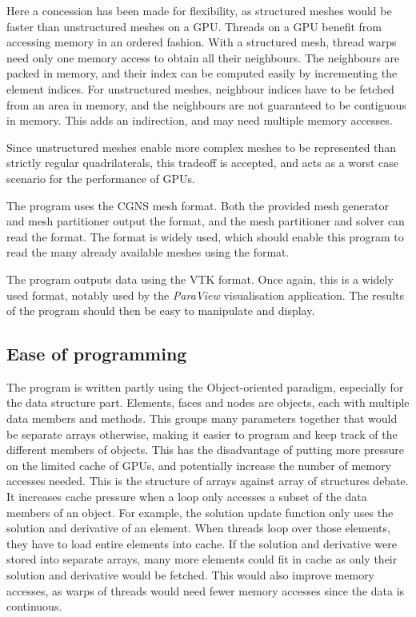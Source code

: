 Here a concession has been made for flexibility, as structured meshes would be faster than
unstructured meshes on a GPU. Threads on a GPU benefit from accessing memory in an ordered fashion.
With a structured mesh, thread warps need only one memory access to obtain all their neighbours. The
neighbours are packed in memory, and their index can be computed easily by incrementing the element
indices. For unstructured meshes, neighbour indices have to be fetched from an area in memory, and
the neighbours are not guaranteed to be contiguous in memory. This adds an indirection, and may need
multiple memory accesses.

Since unstructured meshes enable more complex meshes to be represented than strictly regular
quadrilaterals, this tradeoff is accepted, and acts as a worst case scenario for the performance of
GPUs.

The program uses the CGNS mesh format. Both the provided mesh generator and mesh partitioner output
the format, and the mesh partitioner and solver can read the format. The format is widely used,
which should enable this program to read the many already available meshes using the format.

The program outputs data using the VTK format. Once again, this is a widely used format, notably
used by the \textit{ParaView} visualisation application. The results of the program should then be
easy to manipulate and display.

\subsection{Ease of programming} \label{subsection:graphics_processing_units:data_structure:ease_of_programming}

The program is written partly using the Object-oriented paradigm, especially for the data structure
part. Elements, faces and nodes are objects, each with multiple data members and methods. This
groups many parameters together that would be separate arrays otherwise, making it easier to program
and keep track of the different members of objects. This has the disadvantage of putting more
pressure on the limited cache of GPUs, and potentially increase the number of memory accesses
needed. This is the structure of arrays against array of structures debate. It increases cache
pressure when a loop only accesses a subset of the data members of an object. For example, the
solution update function only uses the solution and derivative of an element. When threads loop over
those elements, they have to load entire elements into cache. If the solution and derivative were
stored into separate arrays, many more elements could fit in cache as only their solution and
derivative would be fetched. This would also improve memory accesses, as warps of threads would need
fewer memory accesses since the data is continuous.

